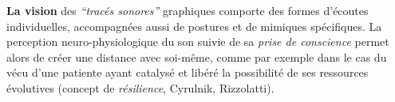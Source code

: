  
 \textbf{La vision}
des \textit{``tracés sonores''} graphiques comporte des formes
d'écoutes individuelles, accompagnées aussi de postures et de mimiques spécifiques.
La  perception  
neuro-physiologique du son suivie de sa 
 \textit{prise de conscience }
permet alors de créer une distance avec
soi-même, comme par exemple dans le cas 
du vécu  d'une patiente ayant catalysé et libéré 
la possibilité de ses ressources évolutives (concept de \textit{résilience}, Cyrulnik, Rizzolatti)\autocite[27--63]{van_eersel_cerveau}.














        

